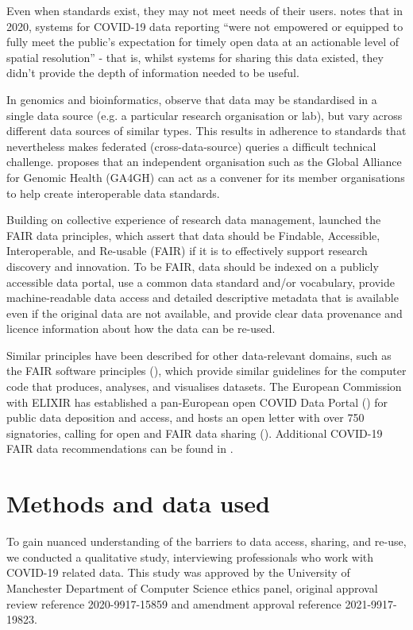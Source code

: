 \documentclass{CUP-JNL-DAP}%
\begin{document}
Even when standards exist, they may not meet needs of their users. \cite{gardner_need_2021} notes that in 2020, systems for COVID-19 data reporting \enquote{were not empowered or equipped to fully meet the public's expectation for timely open data at an actionable level of spatial resolution} - that is, whilst systems for sharing this data existed, they didn't provide the depth of information needed to be useful. 

In genomics and bioinformatics, \cite{thorogood_international_2021} observe that data may be standardised in a single data source (e.g. a particular research organisation or lab), but vary across different data sources of similar types. This results in adherence to standards that nevertheless makes federated (cross-data-source) queries a difficult technical challenge. \cite{thorogood_international_2021} proposes that an independent organisation such as the Global Alliance for Genomic Health (GA4GH) can act as a convener for its member organisations to help create interoperable data standards. 

Building on collective experience of research data management, \cite{wilkinson_fair_2016} launched the FAIR data principles, which assert that data should be Findable, Accessible, Interoperable, and Re-usable (FAIR) if it is to effectively support research discovery and innovation. To be FAIR, data should be indexed on a publicly accessible data portal, use a common data standard and/or vocabulary, provide machine-readable data access and detailed descriptive metadata that is available even if the original data are not available, and provide clear data provenance and licence information about how the data can be re-used. 

Similar principles have been described for other data-relevant domains, such as the FAIR software principles (\cite{chue_hong_fair_2021}), which provide similar guidelines for the computer code that produces, analyses, and visualises datasets. The European Commission with ELIXIR has established a pan-European open COVID Data Portal (\cite{elixirCovidPortal}) for public data deposition and access, and hosts an open letter with over 750 signatories, calling for open and FAIR data sharing (\cite{openDataLetter}). Additional COVID-19 FAIR data recommendations can be found in \cite{FAIR_data_for_a_coordinated_COVID-19_response}.

\section{Methods and data used}
To gain nuanced understanding of the barriers to data access, sharing, and re-use, we conducted a qualitative study, interviewing professionals who work with COVID-19 related data. This study was approved by the University of Manchester Department of Computer Science ethics panel, original approval review reference 2020-9917-15859 and amendment approval reference 2021-9917-19823. 
\end{document}
